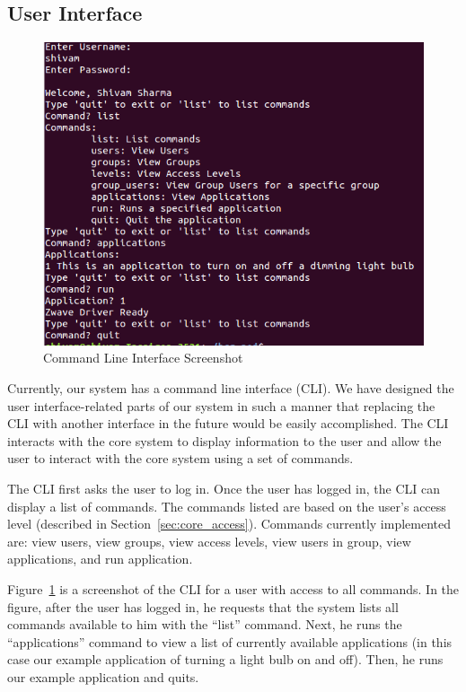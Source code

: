 \subsection{User Interface}
\label{sec:interface}
\begin{figure}[tbh]                                                             
    \centering                                                                  
    \includegraphics[width=1.0\columnwidth]{figs/cli.png}                
    \caption{Command Line Interface Screenshot}                                                      
    \label{Fig:cli}                                                            
\end{figure}
Currently, our system has a command line interface (CLI). We have designed the
user interface-related parts of our system in such a manner that replacing the
CLI with another interface in the future would be easily accomplished. The CLI
interacts with the core system to display information to the user and allow the
user to interact with the core system using a set of commands.

The CLI first asks the user to log in. Once the user has logged in, the CLI can
display a list of commands. The commands listed are based on the user's access
level (described in Section~\ref{sec:core_access}). Commands currently
implemented are: view users, view groups, view access levels, view users in
group, view applications, and run application.

Figure~\ref{Fig:cli} is a screenshot of the CLI for a user with access to all
commands. In the figure, after the user has logged in, he requests that the
system lists all commands available to him with the ``list'' command. Next, he
runs the ``applications'' command to view a list of currently available
applications (in this case our example application of turning a light bulb on
and off). Then, he runs our example application and quits.

